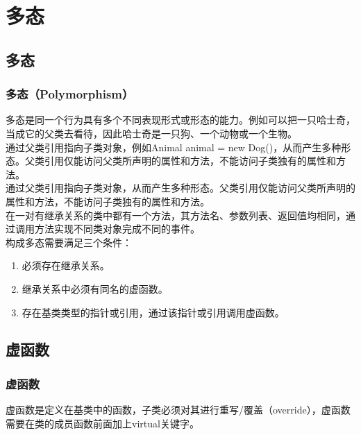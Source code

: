 \chapter{多态}

\section{多态}

\subsection{多态（Polymorphism）}

多态是同一个行为具有多个不同表现形式或形态的能力。例如可以把一只哈士奇，当成它的父类去看待，因此哈士奇是一只狗、一个动物或一个生物。\\

通过父类引用指向子类对象，例如Animal animal = new Dog()，从而产生多种形态。父类引用仅能访问父类所声明的属性和方法，不能访问子类独有的属性和方法。\\

通过父类引用指向子类对象，从而产生多种形态。父类引用仅能访问父类所声明的属性和方法，不能访问子类独有的属性和方法。\\

在一对有继承关系的类中都有一个方法，其方法名、参数列表、返回值均相同，通过调用方法实现不同类对象完成不同的事件。\\

构成多态需要满足三个条件：

\begin{enumerate}
	\item 必须存在继承关系。
	\item 继承关系中必须有同名的虚函数。
	\item 存在基类类型的指针或引用，通过该指针或引用调用虚函数。
\end{enumerate}

\newpage

\section{虚函数}

\subsection{虚函数}

虚函数是定义在基类中的函数，子类必须对其进行重写/覆盖（override），虚函数需要在类的成员函数前面加上virtual关键字。\\

